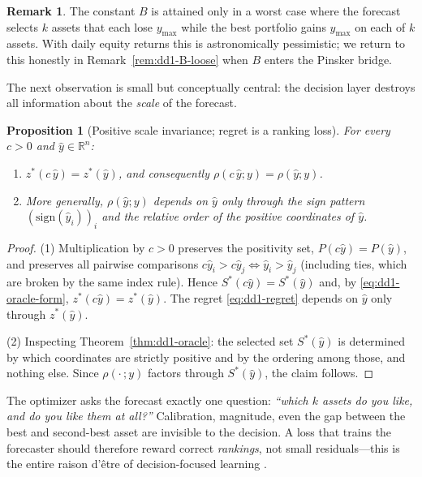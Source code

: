 \documentclass[11pt,a4paper]{article}
\theoremstyle{definition}
\newtheorem{remark}{Remark}[section]
\theoremstyle{plain}
\newtheorem{proposition}{Proposition}[section]
\newcommand{\R}{\mathbb{R}}
\begin{document}
\begin{remark}
The constant $B$ is attained only in a worst case where the forecast selects
$k$ assets that each lose $y_{\max}$ while the best portfolio gains $y_{\max}$
on each of $k$ assets. With daily equity returns this is astronomically
pessimistic; we return to this honestly in
Remark~\ref{rem:dd1-B-loose} when $B$ enters the Pinsker bridge.
\end{remark}

The next observation is small but conceptually central: the decision layer
destroys all information about the \emph{scale} of the forecast.

\begin{proposition}[Positive scale invariance; regret is a ranking loss]
\label{prop:dd1-scale-invariance}
For every $c > 0$ and $\hat{y} \in \R^n$:
\begin{enumerate}
\item $z^*(c\,\hat{y}) = z^*(\hat{y})$, and consequently
$\rho(c\,\hat{y}; y) = \rho(\hat{y}; y)$.
\item More generally, $\rho(\hat{y}; y)$ depends on $\hat{y}$ only through
the sign pattern $(\mathrm{sign}(\hat{y}_i))_{i}$ and the relative order of
the positive coordinates of $\hat{y}$.
\end{enumerate}
\end{proposition}

\begin{proof}
(1) Multiplication by $c > 0$ preserves the positivity set,
$P(c\hat{y}) = P(\hat{y})$, and preserves all pairwise comparisons
$c\hat{y}_i > c\hat{y}_j \iff \hat{y}_i > \hat{y}_j$ (including ties, which
are broken by the same index rule). Hence $S^*(c\hat{y}) = S^*(\hat{y})$ and,
by \eqref{eq:dd1-oracle-form}, $z^*(c\hat{y}) = z^*(\hat{y})$. The regret
\eqref{eq:dd1-regret} depends on $\hat{y}$ only through $z^*(\hat{y})$.

(2) Inspecting Theorem~\ref{thm:dd1-oracle}: the selected set $S^*(\hat{y})$
is determined by which coordinates are strictly positive and by the ordering
among those, and nothing else. Since $\rho(\cdot\,; y)$ factors through
$S^*(\hat{y})$, the claim follows.
\end{proof}

\begin{intuition}
The optimizer asks the forecast exactly one question: \emph{``which $k$ assets
do you like, and do you like them at all?''} Calibration, magnitude, even the
gap between the best and second-best asset are invisible to the decision. A
loss that trains the forecaster should therefore reward correct
\emph{rankings}, not small residuals---this is the entire raison d'\^etre of
decision-focused learning \cite{elmachtoub2022smart, shah2022lodl}.
\end{intuition}
\end{document}
